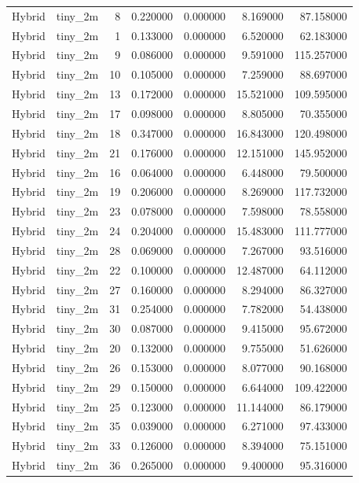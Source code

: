 \begin{tabular}{llrrrrr}
Hybrid & tiny_2m & 8 & 0.220000 & 0.000000 & 8.169000 & 87.158000 \\
Hybrid & tiny_2m & 1 & 0.133000 & 0.000000 & 6.520000 & 62.183000 \\
Hybrid & tiny_2m & 9 & 0.086000 & 0.000000 & 9.591000 & 115.257000 \\
Hybrid & tiny_2m & 10 & 0.105000 & 0.000000 & 7.259000 & 88.697000 \\
Hybrid & tiny_2m & 13 & 0.172000 & 0.000000 & 15.521000 & 109.595000 \\
Hybrid & tiny_2m & 17 & 0.098000 & 0.000000 & 8.805000 & 70.355000 \\
Hybrid & tiny_2m & 18 & 0.347000 & 0.000000 & 16.843000 & 120.498000 \\
Hybrid & tiny_2m & 21 & 0.176000 & 0.000000 & 12.151000 & 145.952000 \\
Hybrid & tiny_2m & 16 & 0.064000 & 0.000000 & 6.448000 & 79.500000 \\
Hybrid & tiny_2m & 19 & 0.206000 & 0.000000 & 8.269000 & 117.732000 \\
Hybrid & tiny_2m & 23 & 0.078000 & 0.000000 & 7.598000 & 78.558000 \\
Hybrid & tiny_2m & 24 & 0.204000 & 0.000000 & 15.483000 & 111.777000 \\
Hybrid & tiny_2m & 28 & 0.069000 & 0.000000 & 7.267000 & 93.516000 \\
Hybrid & tiny_2m & 22 & 0.100000 & 0.000000 & 12.487000 & 64.112000 \\
Hybrid & tiny_2m & 27 & 0.160000 & 0.000000 & 8.294000 & 86.327000 \\
Hybrid & tiny_2m & 31 & 0.254000 & 0.000000 & 7.782000 & 54.438000 \\
Hybrid & tiny_2m & 30 & 0.087000 & 0.000000 & 9.415000 & 95.672000 \\
Hybrid & tiny_2m & 20 & 0.132000 & 0.000000 & 9.755000 & 51.626000 \\
Hybrid & tiny_2m & 26 & 0.153000 & 0.000000 & 8.077000 & 90.168000 \\
Hybrid & tiny_2m & 29 & 0.150000 & 0.000000 & 6.644000 & 109.422000 \\
Hybrid & tiny_2m & 25 & 0.123000 & 0.000000 & 11.144000 & 86.179000 \\
Hybrid & tiny_2m & 35 & 0.039000 & 0.000000 & 6.271000 & 97.433000 \\
Hybrid & tiny_2m & 33 & 0.126000 & 0.000000 & 8.394000 & 75.151000 \\
Hybrid & tiny_2m & 36 & 0.265000 & 0.000000 & 9.400000 & 95.316000 \\

\end{tabular}
